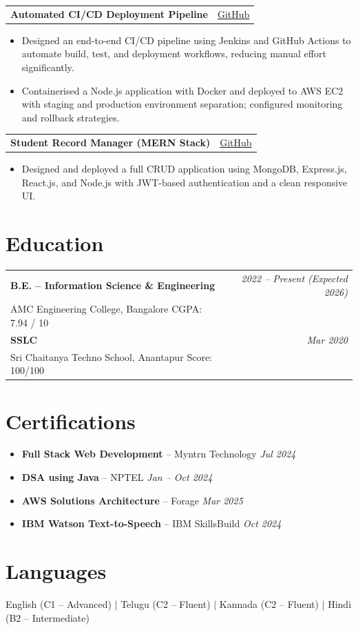 \documentclass[10pt, a4paper]{article}
\makeatletter
\newcommand{\resumeItem}[1]{%
  \item\small{#1}
}
\newcommand{\projectheading}[2]{%
  \noindent
  \begin{tabularx}{\linewidth}{@{}X r@{}}
    \textbf{#1} & \small\href{#2}{\underline{GitHub}}
  \end{tabularx}
  \vspace{-2pt}
}
\newenvironment{itemizeCustom}{%
  \begin{itemize}[leftmargin=12pt, itemsep=1pt, topsep=2pt, parsep=0pt]
}{%
  \end{itemize}
}
\makeatother
\begin{document}
\vspace{4pt}

\projectheading{Automated CI/CD Deployment Pipeline}{https://github.com/manojkumar675}
\begin{itemizeCustom}
  \resumeItem{Designed an end-to-end CI/CD pipeline using Jenkins and GitHub Actions to automate build, test, and deployment workflows, reducing manual effort significantly.}
  \resumeItem{Containerised a Node.js application with Docker and deployed to AWS EC2 with staging and production environment separation; configured monitoring and rollback strategies.}
\end{itemizeCustom}

\vspace{4pt}

\projectheading{Student Record Manager (MERN Stack)}{https://github.com/manojkumar675}
\begin{itemizeCustom}
  \resumeItem{Designed and deployed a full CRUD application using MongoDB, Express.js, React.js, and Node.js with JWT-based authentication and a clean responsive UI.}
\end{itemizeCustom}

\section{Education}

\begin{tabularx}{\linewidth}{@{} X r @{}}
  \textbf{B.E. – Information Science \& Engineering} & \textit{2022 – Present (Expected 2026)} \\
  AMC Engineering College, Bangalore \hspace{4pt} CGPA: 7.94 / 10 & \\[4pt]
  \textbf{SSLC} & \textit{Mar 2020} \\
  Sri Chaitanya Techno School, Anantapur \hspace{4pt} Score: 100/100 & \\
\end{tabularx}

\section{Certifications}
\begin{itemizeCustom}
  \resumeItem{\textbf{Full Stack Web Development} – Myntrn Technology \hfill \textit{Jul 2024}}
  \resumeItem{\textbf{DSA using Java} – NPTEL \hfill \textit{Jan – Oct 2024}}
  \resumeItem{\textbf{AWS Solutions Architecture} – Forage \hfill \textit{Mar 2025}}
  \resumeItem{\textbf{IBM Watson Text-to-Speech} – IBM SkillsBuild \hfill \textit{Oct 2024}}
\end{itemizeCustom}

\section{Languages}
\small English (C1 – Advanced) \;$|$\; Telugu (C2 – Fluent) \;$|$\; Kannada (C2 – Fluent) \;$|$\; Hindi (B2 – Intermediate)
\end{document}
